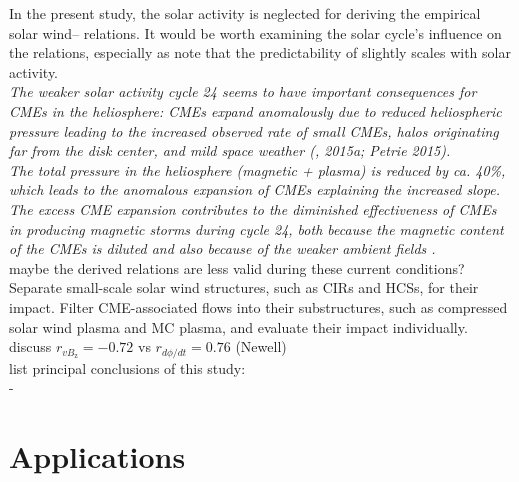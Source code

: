 
In the present study, the solar activity is neglected for deriving the empirical solar wind--\Kp{} relations. It would be worth examining the solar cycle's influence on the relations, especially as \citet{Wing2005} note that the predictability of \Kp{} slightly scales with solar activity.\\

\textit{The weaker solar activity cycle 24 seems to have important consequences for CMEs in the heliosphere: CMEs expand anomalously due to reduced heliospheric pressure leading to the increased observed rate of small CMEs, halos originating far from the disk center, and mild space weather (\citep{Gopalswamy2014}, 2015a; Petrie 2015).\\
The total pressure in the heliosphere (magnetic + plasma) is reduced by ca. 40\%, which leads to the anomalous expansion of CMEs explaining the increased slope. The excess CME expansion contributes to the diminished effectiveness of CMEs in producing magnetic storms during cycle 24, both because the magnetic content of the CMEs is diluted and also because of the weaker ambient fields \citep{Gopalswamy2014}.\\
}
maybe the derived relations are less valid during these current conditions?\\

Separate small-scale solar wind structures, such as CIRs and HCSs, for their \Kp{} impact. Filter CME-associated flows into their substructures, such as compressed solar wind plasma and MC plasma, and evaluate their \Kp{} impact individually.\\

discuss $r_{vB_\text{z}} = -0.72$ vs $r_{d\phi/dt} = 0.76$ (Newell)\\

list principal conclusions of this study:\\
- \\


\section{Applications}

